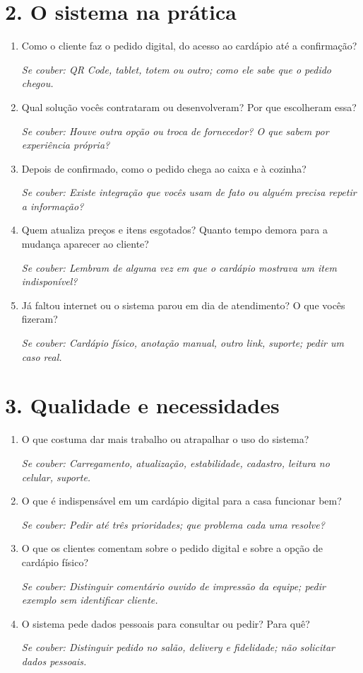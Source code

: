 \documentclass[11pt,a4paper]{article}
\newcommand{\aprofundar}[1]{\par{\small\color{gray}\textit{Se couber: #1}}}
\begin{document}
\section*{2. O sistema na prática}
\begin{enumerate}[resume]
  \item Como o cliente faz o pedido digital, do acesso ao cardápio até a confirmação?
    \aprofundar{QR Code, tablet, totem ou outro; como ele sabe que o pedido chegou.}
  \item Qual solução vocês contrataram ou desenvolveram? Por que escolheram essa?
    \aprofundar{Houve outra opção ou troca de fornecedor? O que sabem por experiência própria?}
  \item Depois de confirmado, como o pedido chega ao caixa e à cozinha?
    \aprofundar{Existe integração que vocês usam de fato ou alguém precisa repetir a informação?}
  \item Quem atualiza preços e itens esgotados? Quanto tempo demora para a mudança aparecer ao cliente?
    \aprofundar{Lembram de alguma vez em que o cardápio mostrava um item indisponível?}
  \item Já faltou internet ou o sistema parou em dia de atendimento? O que vocês fizeram?
    \aprofundar{Cardápio físico, anotação manual, outro link, suporte; pedir um caso real.}
\end{enumerate}

\section*{3. Qualidade e necessidades}
\begin{enumerate}[resume]
  \item O que costuma dar mais trabalho ou atrapalhar o uso do sistema?
    \aprofundar{Carregamento, atualização, estabilidade, cadastro, leitura no celular, suporte.}
  \item O que é indispensável em um cardápio digital para a casa funcionar bem?
    \aprofundar{Pedir até três prioridades; que problema cada uma resolve?}
  \item O que os clientes comentam sobre o pedido digital e sobre a opção de cardápio físico?
    \aprofundar{Distinguir comentário ouvido de impressão da equipe; pedir exemplo sem identificar cliente.}
  \item O sistema pede dados pessoais para consultar ou pedir? Para quê?
    \aprofundar{Distinguir pedido no salão, delivery e fidelidade; não solicitar dados pessoais.}
\end{enumerate}
\end{document}
